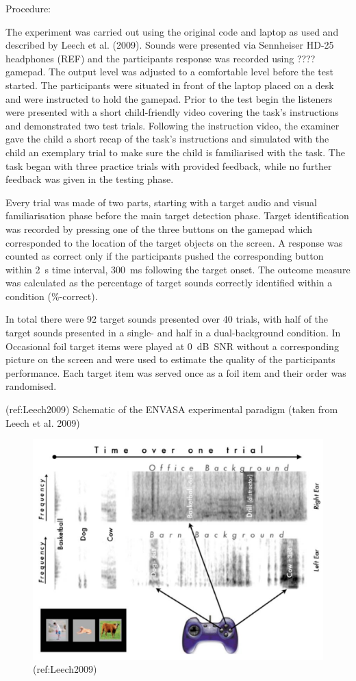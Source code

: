 \documentclass[a4paper,nobind]{templates/ociamthesis}
\begin{document}
Procedure:

The experiment was carried out using the original code and laptop as
used and described by Leech et al. (2009). Sounds were presented via
Sennheiser HD-25 headphones (REF) and the participants response was
recorded using ???? gamepad. The output level was adjusted to a
comfortable level before the test started. The participants were
situated in front of the laptop placed on a desk and were instructed to
hold the gamepad. Prior to the test begin the listeners were presented
with a short child-friendly video covering the task's instructions and
demonstrated two test trials. Following the instruction video, the
examiner gave the child a short recap of the task's instructions and
simulated with the child an exemplary trial to make sure the child is
familiarised with the task. The task began with three practice trials
with provided feedback, while no further feedback was given in the
testing phase.

Every trial was made of two parts, starting with a target audio and
visual familiarisation phase before the main target detection phase.
Target identification was recorded by pressing one of the three buttons
on the gamepad which corresponded to the location of the target objects
on the screen. A response was counted as correct only if the
participants pushed the corresponding button within 2~s time interval,
300~ms following the target onset. The outcome measure was calculated as
the percentage of target sounds correctly identified within a condition
(\%-correct).

In total there were 92 target sounds presented over 40 trials, with half
of the target sounds presented in a single- and half in a
dual-background condition. In Occasional foil target items were played
at 0~dB~SNR without a corresponding picture on the screen and were used
to estimate the quality of the participants performance. Each target
item was served once as a foil item and their order was randomised.

(ref:Leech2009) Schematic of the ENVASA experimental paradigm (taken
from Leech et al. 2009)

\begin{figure}

{\centering \includegraphics[width=0.65\linewidth]{figures/ENVASAparadigm} 

}

\caption{(ref:Leech2009)}\label{fig:ENVASA}
\end{figure}
\end{document}
